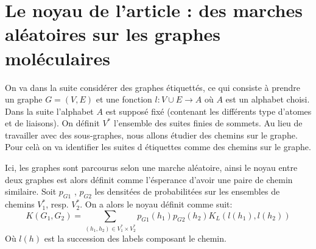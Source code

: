 \section{Le noyau de l'article : des marches al\'eatoires sur les graphes mol\'eculaires}
    \par
        On va dans la suite consid\'erer des graphes \'etiquett\'es, ce qui consiste \`a prendre un graphe
        $G = (V,E)$ et une fonction $l: V \cup E \rightarrow A$ o\`u $A$ est un alphabet choisi.
        Dans la suite l'alphabet $A$ est suppos\'e fix\'e (contenant les diff\'erents type d'atomes
        et de liaisons). On d\'efinit $V^{*}$ l'ensemble des suites finies de sommets.
        Au lieu de travailler avec des sous-graphes, nous allons \'etudier des chemins
        sur le graphe. Pour cel\`a on va identifier les suites d \'etiquettes comme des chemins sur le 
        graphe.
    
    \par
        Ici, les graphes sont parcourus selon une marche al\'eatoire, ainsi le noyau entre deux graphes
        est alors d\'efinit comme l'\'esperance d'avoir une paire de chemin similaire. Soit $p_{G1}$ ,
        ${p_{G2}}$ les densit\'ees de probabilit\'ees sur les ensembles de chemins $V_1^{*}$, resp. $V_2^{*}$.
        On a alors le noyau d\'efinit comme suit:
        \begin{equation}
            K(G_1,G_2) = \sum_{(h_1,h_2) \in V_1^{*} \times V_2^{*}} p_{G1}(h_1) p_{G2}(h_2) K_L(l(h_1),l(h_2))
        \end{equation}
        O\`u $l(h)$ est la succession des labels composant le chemin.

